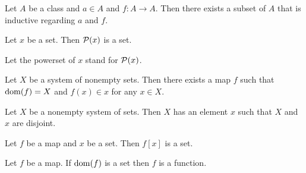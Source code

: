 \documentclass[../set-theory.tex]{subfiles}
\begin{document}
  \begin{forthel}
    \begin{axiom}[Infinity]
      Let $A$ be a class and $a \in A$ and $f : A \to A$.
      Then there exists a subset of $A$ that is inductive regarding $a$ and $f$.
    \end{axiom}
  \end{forthel}

  \begin{forthel}
    \begin{axiom}[Powerset]
      Let $x$ be a set.
      Then $\mathcal{P}(x)$ is a set.
    \end{axiom}

    Let the powerset of $x$ stand for $\mathcal{P}(x)$.
  \end{forthel}

  \begin{forthel}
    \begin{axiom}[Choice]
      Let $X$ be a system of nonempty sets.
      Then there exists a map $f$ such that $\operatorname{dom}(f) = X$ and $f(x) \in x$ for
      any $x \in X$.
    \end{axiom}
  \end{forthel}

  \begin{forthel}
    \begin{axiom}[Foundation]
      Let $X$ be a nonempty system of sets.
      Then $X$ has an element $x$ such that $X$ and $x$ are disjoint.
    \end{axiom}
  \end{forthel}

  \begin{forthel}
    \begin{axiom}[Replacement]
      Let $f$ be a map and $x$ be a set.
      Then $f[x]$ is a set.
    \end{axiom}
  \end{forthel}
  
  \begin{forthel}
    \begin{axiom}[Function]
      Let $f$ be a map.
      If $\operatorname{dom}(f)$ is a set then $f$ is a function.
    \end{axiom}
  \end{forthel}
\end{document}
